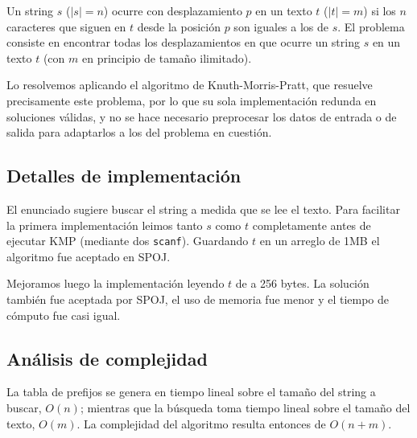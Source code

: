 Un string $s$ ($|s|=n$) ocurre con desplazamiento $p$ en un texto $t$ ($|t|=m$)
si los $n$ caracteres que siguen en $t$ desde la posición $p$ son iguales a los
de $s$. El problema consiste en encontrar todas los desplazamientos en que
ocurre un string $s$ en un texto $t$ (con $m$ en principio de tamaño ilimitado).

Lo resolvemos aplicando el algoritmo de Knuth-Morris-Pratt, que resuelve
precisamente este problema, por lo que su sola implementación redunda en
soluciones válidas, y no se hace necesario preprocesar los datos de entrada o de
salida para adaptarlos a los del problema en cuestión.

\subsection*{Detalles de implementación}

El enunciado sugiere buscar el string a medida que se lee el texto. Para
facilitar la primera implementación leimos tanto $s$ como $t$ completamente
antes de ejecutar KMP (mediante dos {\tt scanf}). Guardando $t$ en un arreglo de
1MB el algoritmo fue aceptado en SPOJ.

Mejoramos luego la implementación leyendo $t$ de a 256 bytes. La solución
también fue aceptada por SPOJ, el uso de memoria fue menor y el tiempo de
cómputo fue casi igual.

\subsection*{Análisis de complejidad}

La tabla de prefijos se genera en tiempo lineal sobre el tamaño del string a
buscar, $O(n)$; mientras que la búsqueda toma tiempo lineal sobre el tamaño
del texto, $O(m)$. La complejidad del algoritmo resulta entonces de $O(n+m)$.
